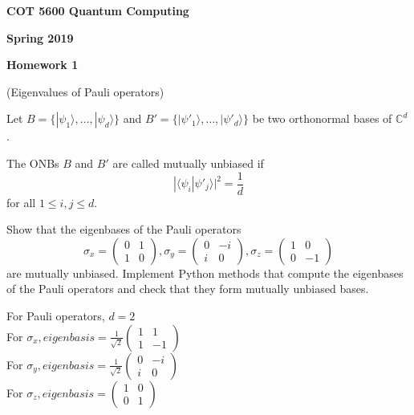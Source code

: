 \documentclass[12pt]{article}
\renewcommand{\>}{\rangle}
\newcommand{\<}{\langle}
\newcommand{\C}{\mathbb{C}}
\begin{document}
\begin{center}
{\bf COT 5600 Quantum Computing} 

\medskip
{\bf Spring 2019}

\bigskip

{\bf Homework 1}
\end{center}

\newpage


 (Eigenvalues of Pauli operators)

\medskip
\noindent
Let $B=\{|\psi_1\>,\ldots,|\psi_d\>\}$ and $B'=\{|\psi'_1\>,\ldots,|\psi'_d\>\}$ be two orthonormal bases of $\C^d$. 

The ONBs $B$ and $B'$ are called mutually unbiased if 
\[
|\< \psi_i | \psi'_j \>|^2 = \frac{1}{d} 
\]
for all $1\le i,j \le d$.

Show that the eigenbases of the Pauli operators 
\[
\sigma_x = 
\left(
\begin{array}{cc}
0 & 1 \\
1 & 0
\end{array}
\right),
%
\sigma_y = 
\left(
\begin{array}{cc}
0 & -i \\
i & 0
\end{array}
\right),
%
\sigma_z = 
\left(
\begin{array}{cc}
1 & 0 \\
0 & -1
\end{array}
\right)
\]
are mutually unbiased. Implement Python methods that compute the eigenbases of the Pauli operators and check that they form mutually unbiased bases. 

\begin{flushleft}
\noindent

For Pauli operators, $d = 2$ \\
For $\sigma_x, eigenbasis = \frac{1}{\sqrt 2} \left(
\begin{array}{cc}
1 & 1 \\
1 & -1
\end{array}
\right)$ \\

For $\sigma_y, eigenbasis = \frac{1}{\sqrt 2} \left(
\begin{array}{cc}
0 & -i \\
i & 0
\end{array}
\right)$ \\

For $\sigma_z, eigenbasis =  \left(
\begin{array}{cc}
1 & 0 \\
0 & 1
\end{array}
\right)$ \\
\end{flushleft}
\end{document}
